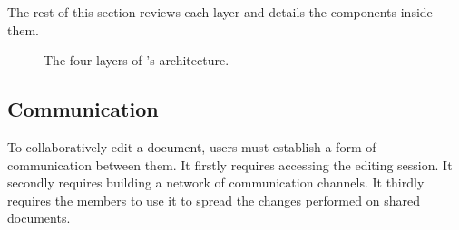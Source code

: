 The rest of this section reviews each layer and details the components inside
them.

\begin{figure}
  \centering
  
  \caption{\label{fig:architecture}The four layers of \CRATE's architecture.}
\end{figure}

\subsection{Communication}
\label{subsec:communication}

To collaboratively edit a document, users must establish a form of communication
between them. It firstly requires accessing the editing session. It secondly
requires building a network of communication channels. It thirdly requires the
members to use it to spread the changes performed on shared documents.  

